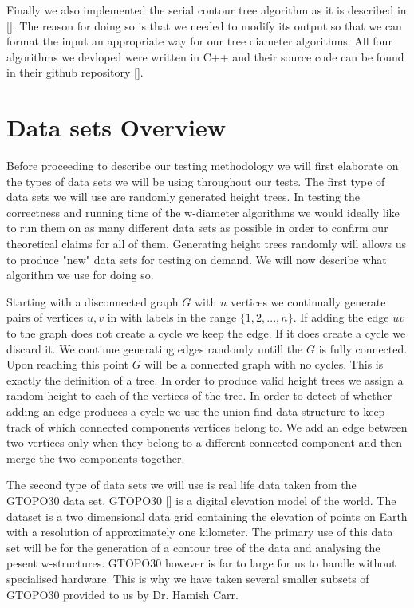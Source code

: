 Finally we also implemented the serial contour tree algorithm as it is described in []. The reason for doing so is that we needed to modify its output so that we can format the input an appropriate way for our tree diameter algorithms. All four algorithms we devloped were written in C++ and their source code can be found in their github repository [].

\section{Data sets Overview}

Before proceeding to describe our testing methodology we will first elaborate on the types of data sets we will be using throughout our tests. The first type of data sets we will use are randomly generated height trees. In testing the correctness and running time of the w-diameter algorithms we would ideally like to run them on as many different data sets as possible in order to confirm our theoretical claims for all of them. Generating height trees randomly will allows us to produce "new" data sets for testing on demand. We will now describe what algorithm we use for doing so.

Starting with a disconnected graph $G$ with $n$ vertices we continually generate pairs of vertices $u, v$ in with labels in the range $\{1, 2, ..., n\}$. If adding the edge $uv$ to the graph does not create a cycle we keep the edge. If it does create a cycle we discard it. We continue generating edges randomly untill the $G$ is fully connected. Upon reaching this point $G$ will be a connected graph with no cycles. This is exactly the definition of a tree. In order to produce valid height trees we assign a random height to each of the vertices of the tree. In order to detect of whether adding an edge produces a cycle we use the union-find data structure to keep track of which connected components vertices belong to. We add an edge between two vertices only when they belong to a different connected component and then merge the two components together.

The second type of data sets we will use is real life data taken from the GTOPO30 data set. GTOPO30 [] is a digital elevation model of the world. The dataset is a two dimensional data grid containing the elevation of points on Earth with a resolution of approximately one kilometer. The primary use of this data set will be for the generation of a contour tree of the data and analysing the pesent w-structures. GTOPO30 however is far to large for us to handle without specialised hardware. This is why we have taken several smaller subsets of GTOPO30 provided to us by Dr. Hamish Carr.

